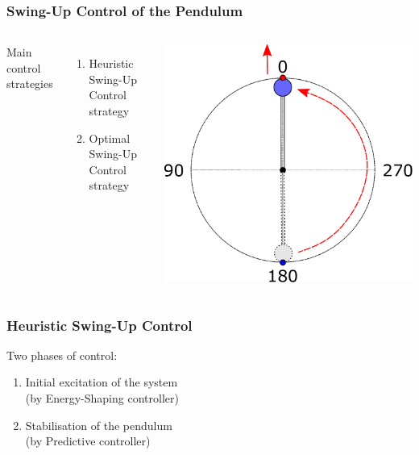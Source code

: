 \documentclass[]{beamer}
\begin{document}
\begin{frame}
	\frametitle{Swing-Up Control of the Pendulum}	
	\begin{columns}[c]	
		Main control strategies
		\begin{enumerate}
			\item Heuristic Swing-Up Control strategy\\
			\item \textcolor{mygray}{Optimal Swing-Up Control strategy}
		\end{enumerate}
		\includegraphics[scale=0.29]{images/OP_total.pdf}
	\end{columns}
\end{frame}

\begin{frame}	
	\frametitle{Heuristic Swing-Up Control}	
	Two phases of control:
	\begin{enumerate}
		\item Initial excitation of the system\\ (by Energy-Shaping controller)\\
		\item Stabilisation of the pendulum\\(by Predictive controller)
	\end{enumerate}
\end{frame}	
\end{document}
